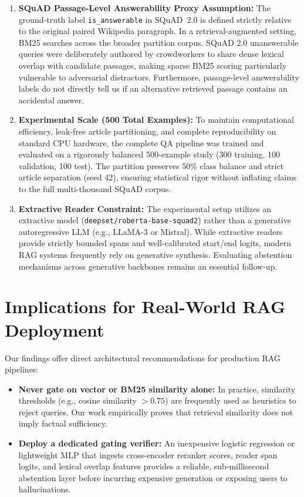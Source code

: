 \begin{enumerate}
  \item \textbf{SQuAD Passage-Level Answerability Proxy Assumption:} The ground-truth label \texttt{is\_answerable} in SQuAD~2.0 is defined strictly relative to the original paired Wikipedia paragraph. In a retrieval-augmented setting, BM25 searches across the broader partition corpus. SQuAD 2.0 unanswerable queries were deliberately authored by crowdworkers to share dense lexical overlap with candidate passages, making sparse BM25 scoring particularly vulnerable to adversarial distractors. Furthermore, passage-level answerability labels do not directly tell us if an alternative retrieved passage contains an accidental answer.
  \item \textbf{Experimental Scale (500 Total Examples):} To maintain computational efficiency, leak-free article partitioning, and complete reproducibility on standard CPU hardware, the complete QA pipeline was trained and evaluated on a rigorously balanced 500-example study (300 training, 100 validation, 100 test). The partition preserves 50\% class balance and strict article separation (seed 42), ensuring statistical rigor without inflating claims to the full multi-thousand SQuAD corpus.
  \item \textbf{Extractive Reader Constraint:} The experimental setup utilizes an extractive model (\texttt{deepset/roberta-base-squad2}) rather than a generative autoregressive LLM (e.g., LLaMA-3 or Mistral). While extractive readers provide strictly bounded spans and well-calibrated start/end logits, modern RAG systems frequently rely on generative synthesis. Evaluating abstention mechanisms across generative backbones remains an essential follow-up.
\end{enumerate}

\section{Implications for Real-World RAG Deployment}
\label{sec:disc_deployment}

Our findings offer direct architectural recommendations for production RAG pipelines:
\begin{itemize}
  \item \textbf{Never gate on vector or BM25 similarity alone:} In practice, similarity thresholds (e.g., cosine similarity $> 0.75$) are frequently used as heuristics to reject queries. Our work empirically proves that retrieval similarity does not imply factual sufficiency.
  \item \textbf{Deploy a dedicated gating verifier:} An inexpensive logistic regression or lightweight MLP that ingests cross-encoder reranker scores, reader span logits, and lexical overlap features provides a reliable, sub-millisecond abstention layer before incurring expensive generation or exposing users to hallucinations.
\end{itemize}
